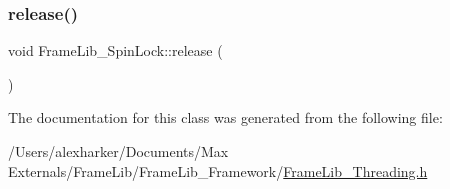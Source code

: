 \mbox{\label{class_frame_lib___spin_lock_a99190b01885c12923f76822d1ba7fb1f}} 
\subsubsection{\texorpdfstring{release()}{release()}}
{\footnotesize\ttfamily void Frame\+Lib\+\_\+\+Spin\+Lock\+::release (\begin{DoxyParamCaption}{ }\end{DoxyParamCaption})\hspace{0.3cm}{\ttfamily [inline]}}



The documentation for this class was generated from the following file\+:\begin{DoxyCompactItemize}
\item 
/\+Users/alexharker/\+Documents/\+Max Externals/\+Frame\+Lib/\+Frame\+Lib\+\_\+\+Framework/\hyperlink{_frame_lib___threading_8h}{Frame\+Lib\+\_\+\+Threading.\+h}\end{DoxyCompactItemize}
